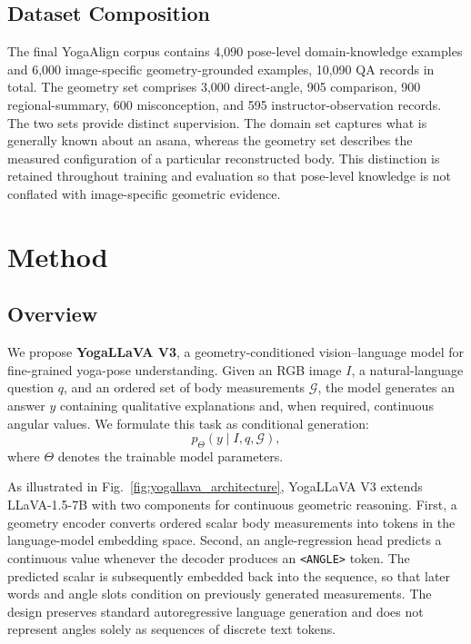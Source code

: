 \documentclass[conference]{IEEEtran}
\begin{document}
\subsection{Dataset Composition}
\label{subsec:dataset_composition}

The final YogaAlign corpus contains 4,090 pose-level domain-knowledge examples and 6,000 image-specific geometry-grounded examples, 10,090 QA records in total.
The geometry set comprises 3,000 direct-angle, 905 comparison, 900 regional-summary, 600 misconception, and 595 instructor-observation records.
The two sets provide distinct supervision.
The domain set captures what is generally known about an asana, whereas the geometry set describes the measured configuration of a particular reconstructed body.
This distinction is retained throughout training and evaluation so that pose-level knowledge is not conflated with image-specific geometric evidence.
\section{Method}
\label{sec:methodology}

\subsection{Overview}
\label{sec:method_overview}

We propose \textbf{YogaLLaVA V3}, a geometry-conditioned vision--language model for fine-grained yoga-pose understanding.
Given an RGB image $I$, a natural-language question $q$, and an ordered set of body measurements $\mathcal{G}$, the model generates an answer $y$ containing qualitative explanations and, when required, continuous angular values.
We formulate this task as conditional generation:
\begin{equation}
    p_{\Theta}(y\mid I,q,\mathcal{G}),
    \label{eq:problem_formulation}
\end{equation}
where $\Theta$ denotes the trainable model parameters.

As illustrated in Fig.~\ref{fig:yogallava_architecture}, YogaLLaVA V3 extends LLaVA-1.5-7B with two components for continuous geometric reasoning.
First, a geometry encoder converts ordered scalar body measurements into tokens in the language-model embedding space.
Second, an angle-regression head predicts a continuous value whenever the decoder produces an \texttt{<ANGLE>} token.
The predicted scalar is subsequently embedded back into the sequence, so that later words and angle slots condition on previously generated measurements.
The design preserves standard autoregressive language generation and does not represent angles solely as sequences of discrete text tokens.
\end{document}
